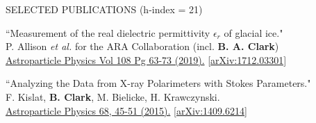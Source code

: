 \documentclass{resume} %
\begin{document}
\begin{rSection}{SELECTED PUBLICATIONS (h-index = 21)}
\begin{etaremune}
  \item ``Measurement of the real dielectric permittivity $\epsilon_r$ of glacial ice." \\
 P. Allison {\it et al.} for the ARA Collaboration (incl. \textbf{B. A. Clark}) \\
 \href{https://doi.org/10.1016/j.astropartphys.2019.01.004}{Astroparticle Physics Vol 108 Pg 63-73 (2019).} \href{https://arxiv.org/abs/1712.03301}{[arXiv:1712.03301]} 

   \item ``Analyzing the Data from X-ray Polarimeters with Stokes Parameters." \\
 F. Kislat,  \textbf{B. Clark}, M. Bielicke, H. Krawczynski.  \\
  \href{http://dx.doi.org/10.1016/j.astropartphys.2015.02.007}{Astroparticle Physics 68, 45-51 (2015).} \href{https://arxiv.org/abs/1409.6214}{[arXiv:1409.6214]} 
  


 \end{etaremune}
 
\end{rSection}

\newpage
\end{document}
